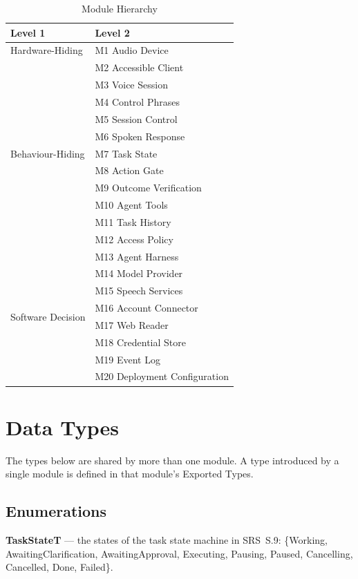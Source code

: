 \documentclass[12pt, titlepage]{article}
\begin{document}
\begin{table}[H]
\centering
\begin{tabular}{p{} p{}}
\toprule
\textbf{Level 1} & \textbf{Level 2}\\
\midrule
Hardware-Hiding & M1 Audio Device\\
\midrule
\multirow{11}{0.3\textwidth}{Behaviour-Hiding}
& M2 Accessible Client\\
& M3 Voice Session\\
& M4 Control Phrases\\
& M5 Session Control\\
& M6 Spoken Response\\
& M7 Task State\\
& M8 Action Gate\\
& M9 Outcome Verification\\
& M10 Agent Tools\\
& M11 Task History\\
& M12 Access Policy\\
\midrule
\multirow{8}{0.3\textwidth}{Software Decision}
& M13 Agent Harness\\
& M14 Model Provider\\
& M15 Speech Services\\
& M16 Account Connector\\
& M17 Web Reader\\
& M18 Credential Store\\
& M19 Event Log\\
& M20 Deployment Configuration\\
\bottomrule
\end{tabular}
\caption{Module Hierarchy}
\label{TblMH}
\end{table}

\section{Data Types} \label{sec:types}

The types below are shared by more than one module. A type introduced by a
single module is defined in that module's Exported Types.

\subsection{Enumerations}

\noindent\textbf{TaskStateT} \label{type:TaskState} --- the states of the task
state machine in SRS~S.9: \{Working, AwaitingClarification, AwaitingApproval,
Executing, Pausing, Paused, Cancelling, Cancelled, Done, Failed\}.
\end{document}
